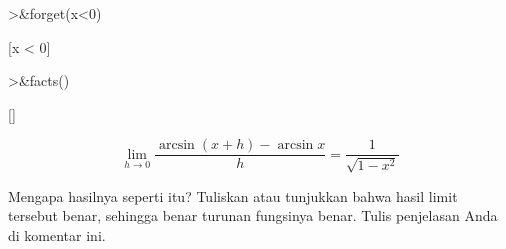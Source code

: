 \documentclass[a4paper,11pt,oneside,enabledeprecatedfontcommands]{scrbook}
\newenvironment{eulernotebook}{}{}
\newenvironment{eulercomment}{\par\medskip\noindent}{\par\medskip}
\newenvironment{eulerformula}{}{}
\begin{document}
\begin{eulernotebook}
\begin{euleroutput}
                                                 [x > 0]
  
\end{euleroutput}
\begin{eulerprompt}
>&forget(x<0)
\end{eulerprompt}
\begin{euleroutput}
  
                                                 [x < 0]
  
\end{euleroutput}
\begin{eulerprompt}
>&facts()
\end{eulerprompt}
\begin{euleroutput}
  
                                                    []
  
\end{euleroutput}
\begin{eulerformula}
\[
\lim_{h\rightarrow 0}{\frac{\arcsin \left(x+h\right)-\arcsin x}{h}}=  \frac{1}{\sqrt{1-x^2}}
\]
\end{eulerformula}
\begin{eulercomment}
Mengapa hasilnya seperti itu? Tuliskan atau tunjukkan bahwa hasil limit tersebut benar, sehingga benar turunan fungsinya benar. Tulis penjelasan Anda di komentar ini.


\end{eulercomment}
\end{eulernotebook}
\end{document}
